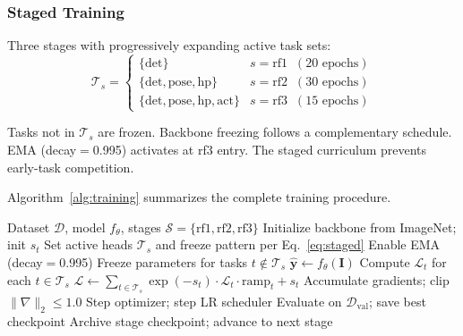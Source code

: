 \documentclass[10pt,twocolumn]{article}
\newcommand{\popw}{POPW}
\begin{document}
\subsubsection{Staged Training}

Three stages with progressively expanding active task sets:
\begin{equation}
\mathcal{T}_s = \begin{cases}
\{\text{det}\} & s = \text{rf1} \;\;(\text{20 epochs}) \\
\{\text{det}, \text{pose}, \text{hp}\} & s = \text{rf2} \;\;(\text{30 epochs}) \\
\{\text{det}, \text{pose}, \text{hp}, \text{act}\} & s = \text{rf3} \;\;(\text{15 epochs})
\end{cases}
\end{equation}

Tasks not in $\mathcal{T}_s$ are frozen. Backbone freezing follows a complementary schedule. EMA (decay$=$0.995) activates at rf3 entry. The staged curriculum prevents early-task competition.

Algorithm~\ref{alg:training} summarizes the complete training procedure.

\begin{algorithm}[htbp]
\caption{\popw{} Staged Multi-Task Training}
\label{alg:training}
\begin{algorithmic}[1]
\Require Dataset $\mathcal{D}$, model $f_\theta$, stages $\mathcal{S}{=}\{\text{rf1},\text{rf2},\text{rf3}\}$
\State Initialize backbone from ImageNet; init $s_t$
    \State Set active heads $\mathcal{T}_s$ and freeze pattern per Eq.~\ref{eq:staged}
     Enable EMA (decay$=$0.995) \EndIf
        \State Freeze parameters for tasks $t \notin \mathcal{T}_s$
            \State $\hat{\mathbf{y}} \leftarrow f_\theta(\mathbf{I})$
            \State Compute $\mathcal{L}_t$ for each $t \in \mathcal{T}_s$
            \State $\mathcal{L} \leftarrow \sum_{t \in \mathcal{T}_s} \exp(-s_t) \cdot \mathcal{L}_t \cdot \text{ramp}_t + s_t$
            \State Accumulate gradients; clip $\|\nabla\|_2 \leq 1.0$
            \State Step optimizer; step LR scheduler
        \EndFor
        \State Evaluate on $\mathcal{D}_\text{val}$; save best checkpoint
    \EndFor
    \State Archive stage checkpoint; advance to next stage
\EndFor
\end{algorithmic}
\end{algorithm}
\end{document}

